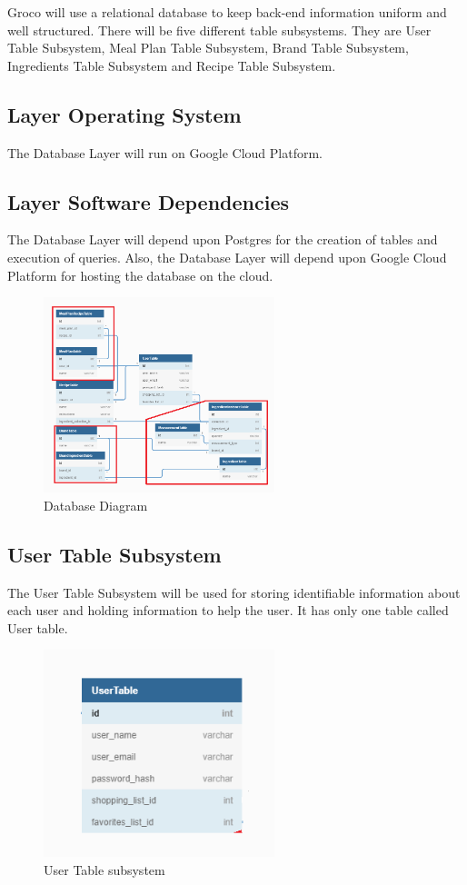 Groco will use a relational database to keep back-end information uniform and well structured. There will be five different table subsystems. They are User Table Subsystem, Meal Plan Table Subsystem, Brand Table Subsystem, Ingredients Table Subsystem and Recipe Table Subsystem.

\subsection{Layer Operating System}
The Database Layer will run on Google Cloud Platform.

\subsection{Layer Software Dependencies}
The Database Layer will depend upon Postgres for the creation of tables and execution of queries. Also, the Database Layer will depend upon Google Cloud Platform for hosting the database on the cloud. 

\begin{figure}[h!]
	\centering
 	\includegraphics[width=0.60\textwidth]{images/Database.png}
 \caption{Database Diagram}
\end{figure}

\subsection{User Table Subsystem}
The User Table Subsystem will be used for storing identifiable information about each user and holding information to help the user. It has only one table called User table.

\begin{figure}[h!]
	\centering
 	\includegraphics[width=0.60\textwidth]{images/User_Table.png}
 \caption{User Table subsystem }
\end{figure}

